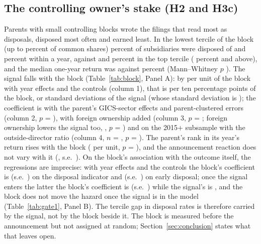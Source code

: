 \subsection{The controlling owner's stake (H2 and H3c)}\label{sec:block}

Parents with small controlling blocks wrote the filings that read most as disposals, disposed most often and earned least. In the lowest tercile of the block (up to \LowBlockMax{} percent of common shares) \LowBlockDisp{} percent of subsidiaries were disposed of and \LowBlockEarly{} percent within a year, against \HighBlockDisp{} and \HighBlockEarly{} percent in the top tercile (\HighBlockMin{} percent and above), and the median one-year return was \LowBlockMedian{} against \HighBlockMedian{} percent (Mann--Whitney $p$ \LowHighMWP{}). The signal falls with the block (Table~\ref{tab:block}, Panel A): by \ScoreOnBlock{} per unit of the block with year effects and the controls (column 1), that is \ScoreOnBlockTenPP{} per ten percentage points of the block, or \ScoreOnBlockTenPPSD{} standard deviations of the signal (whose standard deviation is \ScoreSD{}); the coefficient is \BlockScoreSector{} with the parent's GICS-sector effects and parent-clustered errors (column 2, $p$ = \BlockScoreSectorP{}), \BlockScoreForeign{} with foreign ownership added (column 3, $p$ = \BlockScoreForeignP{}; foreign ownership lowers the signal too, \ForeignOnScore{}, $p$ = \ForeignOnScoreP{}) and \BlockScoreBoard{} on the 2015+ subsample with the outside-director ratio (column 4, $n$ = \BlockScoreBoardN{}, $p$ = \BlockScoreBoardP{}). The parent's rank in its year's return rises with the block (\RankOnBlock{} per unit, $p$ = \RankOnBlockP{}), and the announcement reaction does not vary with it (\BlockOnCar{}, s.e.\ \BlockOnCarSE{}). On the block's association with the outcome itself, the regressions are imprecise: with year effects and the controls the block's coefficient is \BlockOnDisposed{} (s.e.\ \BlockOnDisposedSE{}) on the disposal indicator and \BlockOnEarlyAlone{} (s.e.\ \BlockOnEarlyAloneSE{}) on early disposal; once the signal enters the latter the block's coefficient is \BlockOnEarlyWithScore{} (s.e.\ \BlockOnEarlyWithScoreSE{}) while the signal's is \ScoreOnEarlyWithBlock{}, and the block does not move the hazard once the signal is in the model (Table~\ref{tab:gate1}, Panel B). The tercile gap in disposal rates is therefore carried by the signal, not by the block beside it. The block is measured before the announcement but not assigned at random; Section~\ref{sec:conclusion} states what that leaves open.


